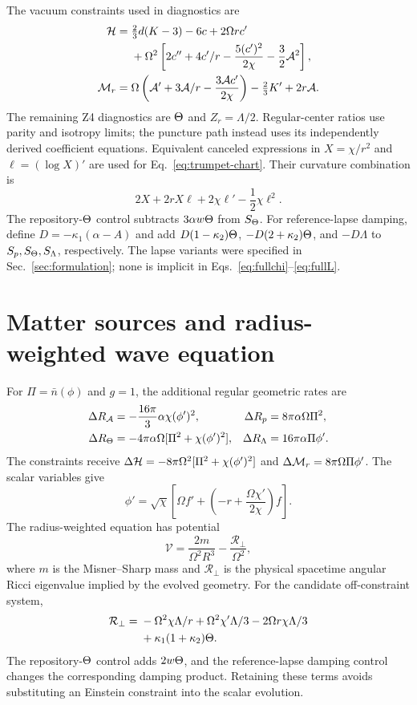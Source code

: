 The vacuum constraints used in diagnostics are
\begin{align}
 \mathcal H={}&\tfrac23d(K-3)-6c+2\Omega r c'\nonumber\\
 &+\Omega^2\left[2c''+4c'/r-\frac{5(c')^2}{2\chi}-\frac32\mathcal A^2\right],\\
 \mathcal M_r={}&\Omega\left(\mathcal A'+3\mathcal A/r-\frac{3\mathcal A c'}{2\chi}\right)
 -\tfrac23K'+2r\mathcal A.
\end{align}
The remaining Z4 diagnostics are $\Theta$ and $Z_r=\Lambda/2$. Regular-center ratios use parity and isotropy limits; the puncture path instead uses its independently derived coefficient equations. Equivalent canceled expressions in $X=\chi/r^2$ and $\ell=(\log X)'$ are used for Eq.~\eqref{eq:trumpet-chart}. Their curvature combination is
\begin{equation}
 2X+2rX\ell+2\chi\ell'-\frac12\chi\ell^2.
\end{equation}
The repository-$\Theta$ control subtracts $3\alpha w\Theta$ from $S_\Theta$. For reference-lapse damping, define $D=-\kappa_1(\alpha-A)$ and add $D(1-\kappa_2)\Theta$, $-D(2+\kappa_2)\Theta$, and $-D\Lambda$ to $S_p,S_\Theta,S_\Lambda$, respectively. The lapse variants were specified in Sec.~\ref{sec:formulation}; none is implicit in Eqs.~\eqref{eq:fullchi}--\eqref{eq:fullL}.

\section{Matter sources and radius-weighted wave equation}
\label{app:matter}
For $\Pi=\bar n(\phi)$ and $g=1$, the additional regular geometric rates are
\begin{align}
 \Delta R_{\mathcal A}&=-\frac{16\pi}{3}\alpha\chi(\phi')^2,&
 \Delta R_p&=8\pi\alpha\Omega\Pi^2,\\
 \Delta R_\Theta&=-4\pi\alpha\Omega[\Pi^2+\chi(\phi')^2],&
 \Delta R_\Lambda&=16\pi\alpha\Pi\phi'.
\end{align}
The constraints receive $\Delta\mathcal H=-8\pi\Omega^2[\Pi^2+\chi(\phi')^2]$ and $\Delta\mathcal M_r=8\pi\Omega\Pi\phi'$. The scalar variables give
\begin{equation}
 \phi'=\sqrt\chi\left[\Omega f'+\left(-r+\frac{\Omega\chi'}{2\chi}\right)f\right].
\end{equation}
The radius-weighted equation has potential
\begin{equation}
 \mathcal V=\frac{2m}{\Omega^2R^3}-\frac{\mathcal R_\perp}{\Omega^2},
\end{equation}
where $m$ is the Misner--Sharp mass and $\mathcal R_\perp$ is the physical spacetime angular Ricci eigenvalue implied by the evolved geometry. For the candidate off-constraint system,
\begin{align}
 \mathcal R_\perp={}&-\Omega^2\chi\Lambda/r+\Omega^2\chi'\Lambda/3
 -2\Omega r\chi\Lambda/3\nonumber\\
 &+\kappa_1(1+\kappa_2)\Theta.
\end{align}
The repository-$\Theta$ control adds $2w\Theta$, and the reference-lapse damping control changes the corresponding damping product. Retaining these terms avoids substituting an Einstein constraint into the scalar evolution.

